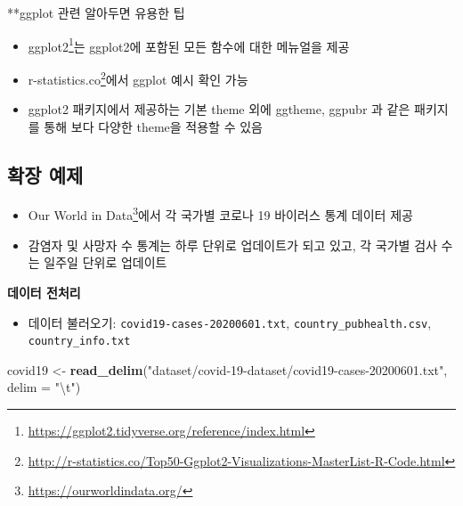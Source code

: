 \documentclass[
  11pt,
]{krantz}
\makeatletter
\newenvironment{Shaded}{\begin{snugshade}}{\end{snugshade}}
\newcommand{\CharTok}[1]{\textcolor[rgb]{0.5,0.5,0.5}{#1}}
\newcommand{\DataTypeTok}[1]{\textcolor[rgb]{0.27,0.27,0.27}{#1}}
\newcommand{\KeywordTok}[1]{\textcolor[rgb]{0.27,0.27,0.27}{\textbf{#1}}}
\newcommand{\NormalTok}[1]{#1}
\newcommand{\StringTok}[1]{\textcolor[rgb]{0.5,0.5,0.5}{#1}}
\providecommand{\tightlist}{%
  \setlength{\itemsep}{0pt}\setlength{\parskip}{0pt}}
\renewcommand{\href}[2]{#2\footnote{\url{#1}}}
\newenvironment{kframe}{%
\medskip{}
\setlength{\fboxsep}{.8em}
 \def\at@end@of@kframe{}%
 \ifinner\ifhmode%
  \def\at@end@of@kframe{\end{minipage}}%
  \begin{minipage}{\columnwidth}%
 \fi\fi%
 \def\FrameCommand##1{\hskip\@totalleftmargin \hskip-\fboxsep
 \colorbox{shadecolor}{##1}\hskip-\fboxsep
     \hskip-\linewidth \hskip-\@totalleftmargin \hskip\columnwidth}%
 \MakeFramed {\advance\hsize-\width
   \@totalleftmargin\z@ \linewidth\hsize
   \@setminipage}}%
 {\par\unskip\endMakeFramed%
 \at@end@of@kframe}
\newenvironment{rmdblock}[1]
  {
  \begin{itemize}
  \renewcommand{\labelitemi}{
    \raisebox{-.7\height}[0pt][0pt]{
      {\setkeys{Gin}{width=3em,keepaspectratio}\texttt{[image: images/\#1]}}
    }
  }
  \setlength{\fboxsep}{1em}
  \begin{kframe}
  \item
  }
  {
  \end{kframe}
  \end{itemize}
  }
\newenvironment{rmdtip}
  {\begin{rmdblock}{tip}}
  {\end{rmdblock}}
\makeatother
\begin{document}
\footnotesize

\begin{rmdtip}
\begin{rmdtip}

**ggplot 관련 알아두면 유용한 팁

\begin{itemize}
\tightlist
\item
  \href{https://ggplot2.tidyverse.org/reference/index.html}{ggplot2}는 ggplot2에 포함된 모든 함수에 대한 메뉴얼을 제공
\item
  \href{http://r-statistics.co/Top50-Ggplot2-Visualizations-MasterList-R-Code.html}{r-statistics.co}에서 ggplot 예시 확인 가능
\item
  ggplot2 패키지에서 제공하는 기본 theme 외에 ggtheme, ggpubr 과 같은 패키지를 통해 보다 다양한 theme을 적용할 수 있음
\end{itemize}

\end{rmdtip}
\end{rmdtip}

\normalsize

\hypertarget{ggplot-application}{%
\subsection{확장 예제}\label{ggplot-application}}

\begin{itemize}
\tightlist
\item
  \href{https://ourworldindata.org/}{Our World in Data}에서 각 국가별 코로나 19 바이러스 통계 데이터 제공
\item
  감염자 및 사망자 수 통계는 하루 단위로 업데이트가 되고 있고, 각 국가별 검사 수는 일주일 단위로 업데이트
\end{itemize}

\textbf{데이터 전처리}

\begin{itemize}
\tightlist
\item
  데이터 불러오기: \texttt{covid19-cases-20200601.txt}, \texttt{country\_pubhealth.csv}, \texttt{country\_info.txt}
\end{itemize}

\footnotesize

\begin{Shaded}
\begin{Highlighting}[]
\NormalTok{covid19 <-}\StringTok{ }\KeywordTok{read_delim}\NormalTok{(}\StringTok{"dataset/covid-19-dataset/covid19-cases-20200601.txt"}\NormalTok{, }
                      \DataTypeTok{delim =} \StringTok{"}\CharTok{\textbackslash{}t}\StringTok{"}\NormalTok{)}
\end{Highlighting}
\end{Shaded}
\end{document}
